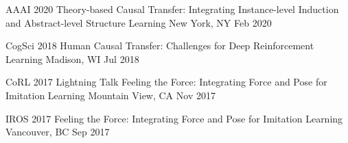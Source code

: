 


\begin{cventries}


\presentationentry
{AAAI 2020} %
{Theory-­based Causal Transfer: Integrating Instance-­level Induction and Abstract­-level Structure Learning} %
{New York, NY} %
{Feb 2020} %
{ %
}
\vspace{-4mm}


\presentationentry
{CogSci 2018} %
{Human Causal Transfer: Challenges for Deep Reinforcement Learning} %
{Madison, WI} %
{Jul 2018} %
{ %
}
\vspace{-4mm}


\presentationentry
{CoRL 2017 Lightning Talk} %
{Feeling the Force: Integrating Force and Pose for Imitation Learning} %
{Mountain View, CA} %
{Nov 2017} %
{ %
}
\vspace{-4mm}


\presentationentry
{IROS 2017} %
{Feeling the Force: Integrating Force and Pose for Imitation Learning} %
{Vancouver, BC} %
{Sep 2017} %
{ %
}
\vspace{-4mm}


\end{cventries}